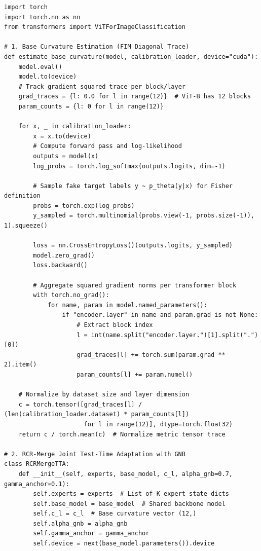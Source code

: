 \documentclass{article}
\theoremstyle{plain}
\theoremstyle{definition}
\theoremstyle{remark}
\begin{document}
\begin{small}
\begin{verbatim}
import torch
import torch.nn as nn
from transformers import ViTForImageClassification

# 1. Base Curvature Estimation (FIM Diagonal Trace)
def estimate_base_curvature(model, calibration_loader, device="cuda"):
    model.eval()
    model.to(device)
    # Track gradient squared trace per block/layer
    grad_traces = {l: 0.0 for l in range(12)}  # ViT-B has 12 blocks
    param_counts = {l: 0 for l in range(12)}
    
    for x, _ in calibration_loader:
        x = x.to(device)
        # Compute forward pass and log-likelihood
        outputs = model(x)
        log_probs = torch.log_softmax(outputs.logits, dim=-1)
        
        # Sample fake target labels y ~ p_theta(y|x) for Fisher definition
        probs = torch.exp(log_probs)
        y_sampled = torch.multinomial(probs.view(-1, probs.size(-1)), 1).squeeze()
        
        loss = nn.CrossEntropyLoss()(outputs.logits, y_sampled)
        model.zero_grad()
        loss.backward()
        
        # Aggregate squared gradient norms per transformer block
        with torch.no_grad():
            for name, param in model.named_parameters():
                if "encoder.layer" in name and param.grad is not None:
                    # Extract block index
                    l = int(name.split("encoder.layer.")[1].split(".")[0])
                    grad_traces[l] += torch.sum(param.grad ** 2).item()
                    param_counts[l] += param.numel()
                    
    # Normalize by dataset size and layer dimension
    c = torch.tensor([grad_traces[l] / (len(calibration_loader.dataset) * param_counts[l])
                      for l in range(12)], dtype=torch.float32)
    return c / torch.mean(c)  # Normalize metric tensor trace

# 2. RCR-Merge Joint Test-Time Adaptation with GNB
class RCRMergeTTA:
    def __init__(self, experts, base_model, c_l, alpha_gnb=0.7, gamma_anchor=0.1):
        self.experts = experts  # List of K expert state_dicts
        self.base_model = base_model  # Shared backbone model
        self.c_l = c_l  # Base curvature vector (12,)
        self.alpha_gnb = alpha_gnb
        self.gamma_anchor = gamma_anchor
        self.device = next(base_model.parameters()).device
        

\end{verbatim}
\end{small}
\end{document}
